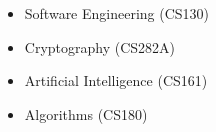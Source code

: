 \begin{cvcourses}
{\begin{multicols}{3}
\begin{itemize}
          \item Software Engineering (CS130) %
          \item Cryptography (CS282A) %
          \item Artificial Intelligence (CS161) %
          \item Algorithms (CS180) %

\end{itemize}
\end{multicols}}
\end{cvcourses}
